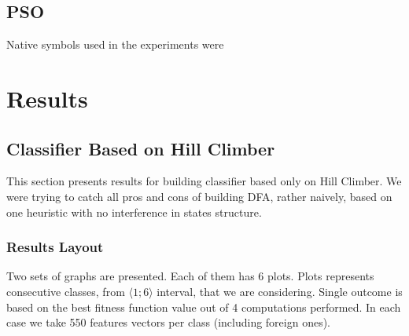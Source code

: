 \documentclass{mini}
\newcommand{\saveResultsFirst}[4]{
    \def\TrainSmallFirst{#1}%
    \def\TrainBigFirst{#2}%
    \def\TrainAllFirst{#3}%
    \def\TestFirst{#4}%
}
\newcommand{\saveResultsSecond}[4]{
    \def\TrainSmallSecond{#1}%
    \def\TrainBigSecond{#2}%
    \def\TrainAllSecond{#3}%
    \def\TestSecond{#4}%
}
\newcommand{\addBarPlotResults}[2]{
    \addplot[style={bblue, fill=bblue, mark=none}]
    coordinates 
    {
        (#1,  \TrainSmallFirst)
        (#2,  \TrainSmallSecond)
    };
    
    \addplot[style={rred, fill=rred, mark=none}]
    coordinates 
    {
        (#1,  \TrainBigFirst)
        (#2,  \TrainBigSecond)
    };
    
    \addplot[style={ggreen, fill=ggreen, mark=none}]
    coordinates 
    {
        (#1,  \TrainAllFirst)
        (#2,  \TrainAllSecond)
    };
    
    \addplot[style={ppurple, fill=ppurple, mark=none}]
    coordinates 
    {
        (#1,  \TestFirst)
        (#2,  \TestSecond)
    };
}
\newcommand{\setPlotStyle}[0]{
    \pgfplotsset{xticklabel style={text width=2em, align=center}}
}
\newcommand{\beginGroupPlot}[0]{
    \begin{groupplot}[
        group style={group size= 2 by 2,  vertical sep=50pt},
        height = 5.5cm, 
        ybar=4*\pgflinewidth, 
        ymin=0, 
        ymax=1,
        width  = 0.37*\textwidth, 
        enlarge x limits={abs=0.85cm}, 
        major x tick style = transparent, 
        ymajorgrids = true, 
        symbolic x coords={
            C=4,
            C=4 Q=3,
            C=4 Q=4,
            C=4 Q=5,
            C=4 Q=6,
            C=4 Q=7,
            C=4 Q=8,
            C=4 Q=9,
            C=4 Q=10,
            C=4 Q=11,
            C=4 Q=12,
            C=4 Q=13,
            C=4 Q=14,
            C=4 Q=15,
            C=5,
            C=5 Q=3,
            C=5 Q=4,
            C=5 Q=5,
            C=5 Q=6,
            C=5 Q=7,
            C=5 Q=8,
            C=5 Q=9,
            C=5 Q=10,
            C=5 Q=11,
            C=5 Q=12,
            C=5 Q=13,
            C=5 Q=14,
            C=5 Q=15
        },
        xtick = data, 
        scaled y ticks = false, 
        legend cell align=center, 
        legend columns=1,
        legend style={
            at={(1.45, 0.45)}, 
            anchor=north,
        }
        ]
    }%
\newcommand{\setPlotLegend}[0]{
        \legend{Training $|w|<C$,  Training $|w|>C$,  Training All,  Testing}
    }
\begin{document}
\section{PSO}
Native symbols used in the experiments were


%    
%    
%    
%    
%    
%    
%    
%    
%    
%    


\chapter{Results}\label{chap:results}

%
%
\section{Classifier Based on Hill Climber}
This section presents results for building classifier based only on Hill Climber. We were trying to catch all pros and cons of building DFA, rather naively, based on one heuristic with no interference in states structure. 

\subsection{Results Layout}
Two sets of graphs are presented. Each of them has 6 plots. Plots represents consecutive classes, from $\langle1;6\rangle$ interval, that we are considering. Single outcome is based on the best fitness function value out of 4 computations performed. In each case we take 550 features vectors per class (including foreign ones). 
\end{document}
